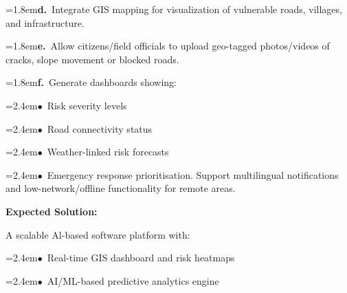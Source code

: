 \documentclass[10pt,a4paper]{article}
\begin{document}
\begin{tcolorbox}[pscard, title={"\textbf{SIH26001} \quad $\vert$ \quad AI-Based early warning and landslide Risk Monitoring System in NER}]
\noindent\hangindent=1.8em\textbf{d.}~\small Integrate GIS mapping for visualization of vulnerable roads, villages, and infrastructure.\par\vspace{0.06cm}
\noindent\hangindent=1.8em\textbf{e.}~\small Allow citizens/field officials to upload geo-tagged photos/videos of cracks, slope movement or blocked roads.\par\vspace{0.06cm}
\noindent\hangindent=1.8em\textbf{f.}~\small Generate dashboards showing:\par\vspace{0.06cm}
\noindent\hspace*{1.2em}\hangindent=2.4em\textcolor{sihblue}{$\bullet$}~\small Risk severity levels\par\vspace{0.05cm}
\noindent\hspace*{1.2em}\hangindent=2.4em\textcolor{sihblue}{$\bullet$}~\small Road connectivity status\par\vspace{0.05cm}
\noindent\hspace*{1.2em}\hangindent=2.4em\textcolor{sihblue}{$\bullet$}~\small Weather-linked risk forecasts\par\vspace{0.05cm}
\noindent\hspace*{1.2em}\hangindent=2.4em\textcolor{sihblue}{$\bullet$}~\small Emergency response prioritisation. Support multilingual notifications and low-network/offline functionality for remote areas.\par\vspace{0.05cm}
\vspace{0.18cm}\noindent\textbf{\color{sihnavy}Expected Solution:}\par\vspace{0.06cm}
\noindent\small A scalable Al-based software platform with:\par\vspace{0.06cm}
\noindent\hspace*{1.2em}\hangindent=2.4em\textcolor{sihblue}{$\bullet$}~\small Real-time GIS dashboard and risk heatmaps\par\vspace{0.05cm}
\noindent\hspace*{1.2em}\hangindent=2.4em\textcolor{sihblue}{$\bullet$}~\small AI/ML-based predictive analytics engine\par\vspace{0.05cm}

\end{tcolorbox}
\end{document}
